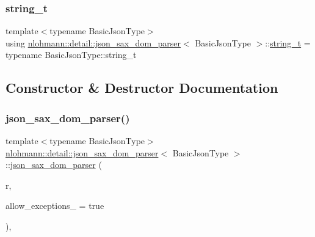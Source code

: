 \subsubsection{\texorpdfstring{string\+\_\+t}{string\_t}}
{\footnotesize\ttfamily template$<$typename Basic\+Json\+Type$>$ \\
using \hyperlink{classnlohmann_1_1detail_1_1json__sax__dom__parser}{nlohmann\+::detail\+::json\+\_\+sax\+\_\+dom\+\_\+parser}$<$ Basic\+Json\+Type $>$\+::\hyperlink{classnlohmann_1_1detail_1_1json__sax__dom__parser_afd4d961ab2a6b01cbe6e840f7fb90cdc}{string\+\_\+t} =  typename Basic\+Json\+Type\+::string\+\_\+t}



\subsection{Constructor \& Destructor Documentation}
\mbox{\label{classnlohmann_1_1detail_1_1json__sax__dom__parser_afc50fee0a92ce84afb84041ebbdfba80}} 
\subsubsection{\texorpdfstring{json\+\_\+sax\+\_\+dom\+\_\+parser()}{json\_sax\_dom\_parser()}\hspace{0.1cm}{\footnotesize\ttfamily [1/3]}}
{\footnotesize\ttfamily template$<$typename Basic\+Json\+Type$>$ \\
\hyperlink{classnlohmann_1_1detail_1_1json__sax__dom__parser}{nlohmann\+::detail\+::json\+\_\+sax\+\_\+dom\+\_\+parser}$<$ Basic\+Json\+Type $>$\+::\hyperlink{classnlohmann_1_1detail_1_1json__sax__dom__parser}{json\+\_\+sax\+\_\+dom\+\_\+parser} (\begin{DoxyParamCaption}\item[{Basic\+Json\+Type \&}]{r,  }\item[{const bool}]{allow\+\_\+exceptions\+\_\+ = {\ttfamily true} }\end{DoxyParamCaption})\hspace{0.3cm}{\ttfamily [inline]}, {\ttfamily [explicit]}}


